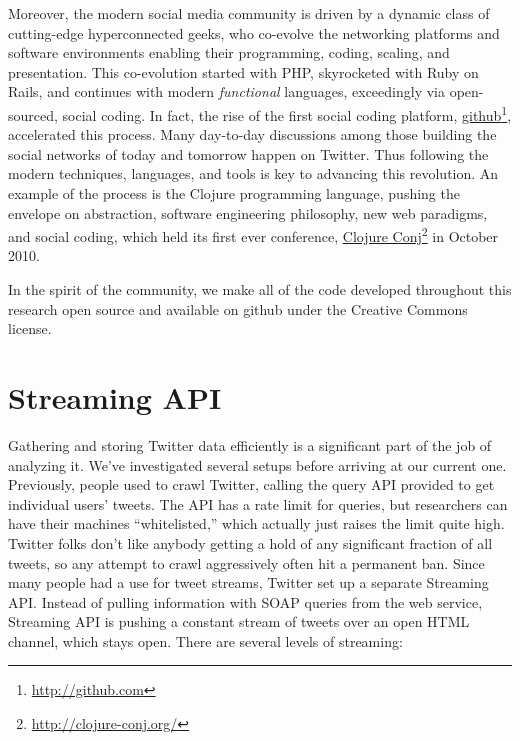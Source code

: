 \documentclass[10pt,oneside]{memoir}
\begin{document}
Moreover, the modern social media community is driven by a dynamic class of cutting-edge hyperconnected geeks, who co-evolve the networking platforms and software environments enabling their programming, coding, scaling, and presentation.  This co-evolution started with PHP, skyrocketed with Ruby on Rails, and continues with modern {\itshape functional} languages, exceedingly via open-sourced, social coding.  In fact, the rise of the first social coding platform, \href{http://github.com}{github}\footnote{\href{http://github.com}{http://github.com}}, accelerated this process. Many day-to-day discussions among those building the social networks of today and tomorrow happen on Twitter.  Thus following the modern techniques, languages, and tools is key to advancing this revolution.  An example of the process is the Clojure programming language, pushing the envelope on abstraction, software engineering philosophy, new web paradigms, and social coding, which held its first ever conference, \href{http://clojure-conj.org/}{Clojure Conj}\footnote{\href{http://clojure-conj.org/}{http://clojure-conj.org/}} in October 2010.


In the spirit of the community, we make all of the code developed throughout this research open source and available on github under the Creative Commons license.


\pagebreak \section{Streaming API}
\label{streamingapi}

\label{StreamingAPI}


Gathering and storing Twitter data efficiently is a significant part of the job of analyzing it.  We've investigated several setups before arriving at our current one.  Previously, people used to crawl Twitter, calling the query API provided to get individual users' tweets.  The API has a rate limit for queries, but researchers can have their machines ``whitelisted,'' which actually just raises the limit quite high.  Twitter folks don't like anybody getting a hold of any significant fraction of all tweets, so any attempt to crawl aggressively often hit a permanent ban.  Since many people had a use for tweet streams, Twitter set up a separate Streaming API.  Instead of pulling information with SOAP queries from the web service, Streaming API is pushing a constant stream of tweets over an open HTML channel, which stays open.  There are several levels of streaming:
\end{document}
